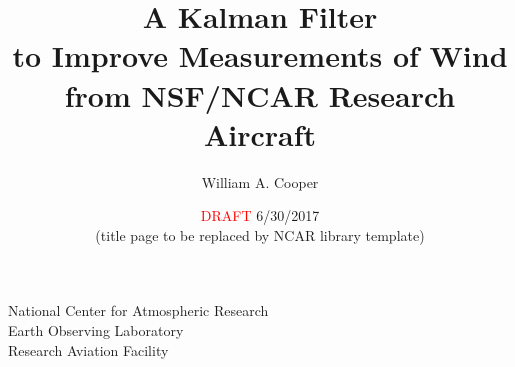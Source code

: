 \documentclass[12pt,twoside,english,12pt,twoside,english]{article}\usepackage[]{graphicx}\usepackage[]{color}
\begin{document}
\title{A Kalman Filter\\
to Improve Measurements of Wind\\
from NSF/NCAR Research Aircraft}

\author{William A. Cooper}

\date{\textcolor{red}{DRAFT} 6/30/2017\\
(title page to be replaced by NCAR library template)}

\maketitle
National Center for Atmospheric Research\\
Earth Observing Laboratory\\
Research Aviation Facility

\vfill{}
\cleardoublepage{} \tableofcontents{} \vfill{}
\eject



\listoffigures

\clearpage %

\listoftables

\clearpage{}
\end{document}
